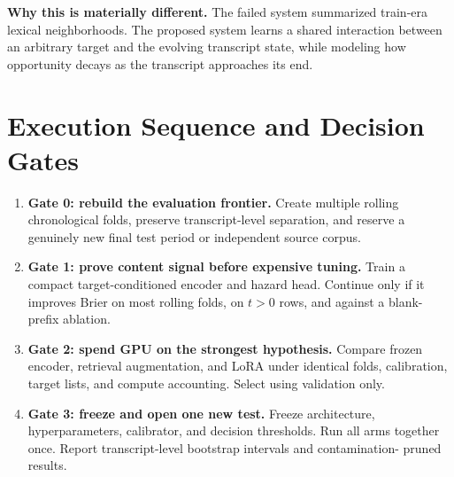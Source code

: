 \documentclass[10pt,a4paper]{article}
\begin{document}
\vspace{5mm}
\begin{keybox}
  \textbf{Why this is materially different.}
  The failed system summarized train-era lexical neighborhoods. The proposed system
  learns a shared interaction between an arbitrary target and the evolving transcript
  state, while modeling how opportunity decays as the transcript approaches its end.
\end{keybox}

\clearpage

\section{Execution Sequence and Decision Gates}

\begin{enumerate}
  \item \textbf{Gate 0: rebuild the evaluation frontier.}
  Create multiple rolling chronological folds, preserve transcript-level separation,
  and reserve a genuinely new final test period or independent source corpus.

  \item \textbf{Gate 1: prove content signal before expensive tuning.}
  Train a compact target-conditioned encoder and hazard head. Continue only if it
  improves Brier on most rolling folds, on \(t>0\) rows, and against a blank-prefix
  ablation.

  \item \textbf{Gate 2: spend GPU on the strongest hypothesis.}
  Compare frozen encoder, retrieval augmentation, and LoRA under identical folds,
  calibration, target lists, and compute accounting. Select using validation only.

  \item \textbf{Gate 3: freeze and open one new test.}
  Freeze architecture, hyperparameters, calibrator, and decision thresholds. Run all
  arms together once. Report transcript-level bootstrap intervals and contamination-
  pruned results.
\end{enumerate}
\end{document}
